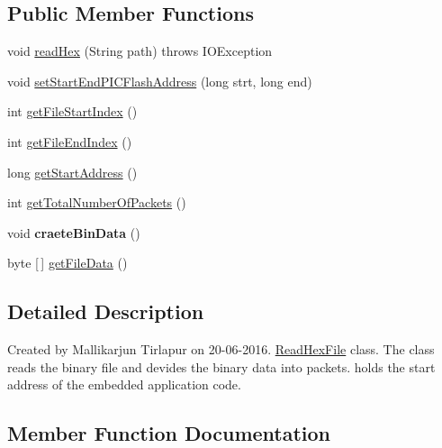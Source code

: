 \subsection*{Public Member Functions}
\begin{DoxyCompactItemize}
\item 
void \hyperlink{classcom_1_1hobby_1_1smart_1_1bluetoothcomm_1_1_read_hex_file_ac2a312201c1ad96d3c8493c438558774}{read\+Hex} (String path)  throws I\+O\+Exception 
\item 
void \hyperlink{classcom_1_1hobby_1_1smart_1_1bluetoothcomm_1_1_read_hex_file_a9c15e4c86ee8bab1c493cc91f42ce1fc}{set\+Start\+End\+P\+I\+C\+Flash\+Address} (long strt, long end)
\item 
int \hyperlink{classcom_1_1hobby_1_1smart_1_1bluetoothcomm_1_1_read_hex_file_a0ba2cab8f8b6d327ea7de323026f8a4b}{get\+File\+Start\+Index} ()
\item 
int \hyperlink{classcom_1_1hobby_1_1smart_1_1bluetoothcomm_1_1_read_hex_file_aa9a9b3a41b9658187eb0b48c0ebc1271}{get\+File\+End\+Index} ()
\item 
long \hyperlink{classcom_1_1hobby_1_1smart_1_1bluetoothcomm_1_1_read_hex_file_aeb5e651ddbcbfe813d0ce57efac2ff31}{get\+Start\+Address} ()
\item 
int \hyperlink{classcom_1_1hobby_1_1smart_1_1bluetoothcomm_1_1_read_hex_file_ae7deceebe800d4531c74ec4b6af7ae95}{get\+Total\+Number\+Of\+Packets} ()
\item 
\mbox{\label{classcom_1_1hobby_1_1smart_1_1bluetoothcomm_1_1_read_hex_file_a019f5aba76fb66339c7c69125c706a7b}} 
void {\bfseries craete\+Bin\+Data} ()
\item 
byte \mbox{[}$\,$\mbox{]} \hyperlink{classcom_1_1hobby_1_1smart_1_1bluetoothcomm_1_1_read_hex_file_aabeb84cb2140d7033dc0a4ac2f3e3fb0}{get\+File\+Data} ()
\end{DoxyCompactItemize}


\subsection{Detailed Description}
Created by Mallikarjun Tirlapur on 20-\/06-\/2016. \hyperlink{classcom_1_1hobby_1_1smart_1_1bluetoothcomm_1_1_read_hex_file}{Read\+Hex\+File} class. The class reads the binary file and devides the binary data into packets. holds the start address of the embedded application code. 

\subsection{Member Function Documentation}
\mbox{\label{classcom_1_1hobby_1_1smart_1_1bluetoothcomm_1_1_read_hex_file_aabeb84cb2140d7033dc0a4ac2f3e3fb0}} 
